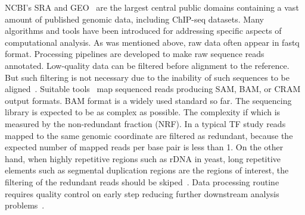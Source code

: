 NCBI's SRA and GEO~\cite{barrett2012ncbi} are the largest central public domains containing a vast amount of published genomic data, including ChIP-seq datasets. 
Many algorithms and tools have been introduced for addressing specific aspects of computational analysis. 
As was mentioned above, raw data often appear in fastq format. 
Processing pipelines are developed to make raw sequence reads annotated.
Low-quality data can be filtered before alignment to the reference. 
But such filtering is not necessary due to the inability of such sequences to be aligned~\cite{furey2012chip}.
Suitable tools~\cite{langmead2009ultrafast, li2009fast, kim2019graph} map sequenced reads producing  SAM, BAM, or CRAM output formats. 
BAM format is a widely used standard so far.
The sequencing library is expected to be as complex as possible. 
The complexity if which is measured by the non-redundant fraction (NRF).
In a typical TF study reads mapped to the same genomic coordinate are filtered as redundant, because the expected number of mapped reads per base pair is less than 1. 
On the other hand, when highly repetitive regions such as rDNA in yeast, long repetitive elements such as segmental duplication regions are the regions of interest, the filtering of the redundant reads should be skiped~\cite{nakato2017recent}.
Data processing routine requires quality control on early step reducing further downstream analysis problems~\cite{ewels2016multiqc}.